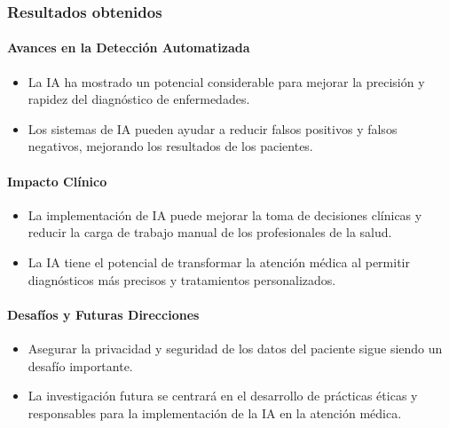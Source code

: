 \subsubsection{Resultados obtenidos}

\paragraph{Avances en la Detección Automatizada}
\begin{itemize}
    \item La IA ha mostrado un potencial considerable para mejorar la precisión y rapidez del diagnóstico de enfermedades.
    \item Los sistemas de IA pueden ayudar a reducir falsos positivos y falsos negativos, mejorando los resultados de los pacientes.
\end{itemize}

\paragraph{Impacto Clínico}
\begin{itemize}
    \item La implementación de IA puede mejorar la toma de decisiones clínicas y reducir la carga de trabajo manual de los profesionales de la salud.
    \item La IA tiene el potencial de transformar la atención médica al permitir diagnósticos más precisos y tratamientos personalizados.
\end{itemize}

\paragraph{Desafíos y Futuras Direcciones}
\begin{itemize}
    \item Asegurar la privacidad y seguridad de los datos del paciente sigue siendo un desafío importante.
    \item La investigación futura se centrará en el desarrollo de prácticas éticas y responsables para la implementación de la IA en la atención médica.
\end{itemize}
